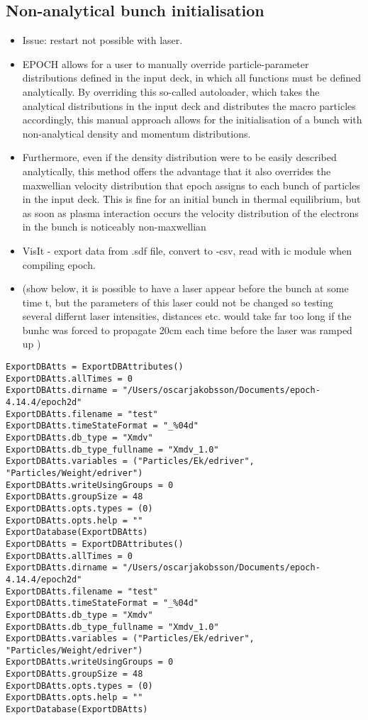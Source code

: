 \subsection{Non-analytical bunch initialisation}
\begin{itemize}
\item Issue: restart not possible with laser. 
\item EPOCH allows for a user to manually override particle-parameter distributions defined in the input deck, in which all functions must be defined analytically. By overriding this so-called autoloader, which takes the analytical distributions in the input deck and distributes the macro particles accordingly, this manual approach allows for the initialisation of a bunch with non-analytical density and momentum distributions. 
\item Furthermore, even if the density distribution were to be easily described analytically, this method offers the advantage that it also overrides the maxwellian velocity distribution that epoch assigns to each bunch of particles in the input deck. This is fine for an initial bunch in thermal equilibrium, but as soon as plasma interaction occurs the velocity distribution of the electrons in the bunch is noticeably non-maxwellian
\item VisIt - export data from .sdf file, convert to -csv, read with ic module when compiling epoch.
\item (show below, it is possible to have a laser appear before the bunch at some time t, but the parameters of this laser could not be changed so testing several differnt laser intensities, distances etc. would take far too long if the bunhc was forced to propagate 20cm each time before the laser was ramped up )
\end{itemize}




\clearpage
\begin{verbatim}
ExportDBAtts = ExportDBAttributes()
ExportDBAtts.allTimes = 0
ExportDBAtts.dirname = "/Users/oscarjakobsson/Documents/epoch-4.14.4/epoch2d"
ExportDBAtts.filename = "test"
ExportDBAtts.timeStateFormat = "_%04d"
ExportDBAtts.db_type = "Xmdv"
ExportDBAtts.db_type_fullname = "Xmdv_1.0"
ExportDBAtts.variables = ("Particles/Ek/edriver", "Particles/Weight/edriver")
ExportDBAtts.writeUsingGroups = 0
ExportDBAtts.groupSize = 48
ExportDBAtts.opts.types = (0)
ExportDBAtts.opts.help = ""
ExportDatabase(ExportDBAtts)
ExportDBAtts = ExportDBAttributes()
ExportDBAtts.allTimes = 0
ExportDBAtts.dirname = "/Users/oscarjakobsson/Documents/epoch-4.14.4/epoch2d"
ExportDBAtts.filename = "test"
ExportDBAtts.timeStateFormat = "_%04d"
ExportDBAtts.db_type = "Xmdv"
ExportDBAtts.db_type_fullname = "Xmdv_1.0"
ExportDBAtts.variables = ("Particles/Ek/edriver", "Particles/Weight/edriver")
ExportDBAtts.writeUsingGroups = 0
ExportDBAtts.groupSize = 48
ExportDBAtts.opts.types = (0)
ExportDBAtts.opts.help = ""
ExportDatabase(ExportDBAtts)

\end{verbatim}


